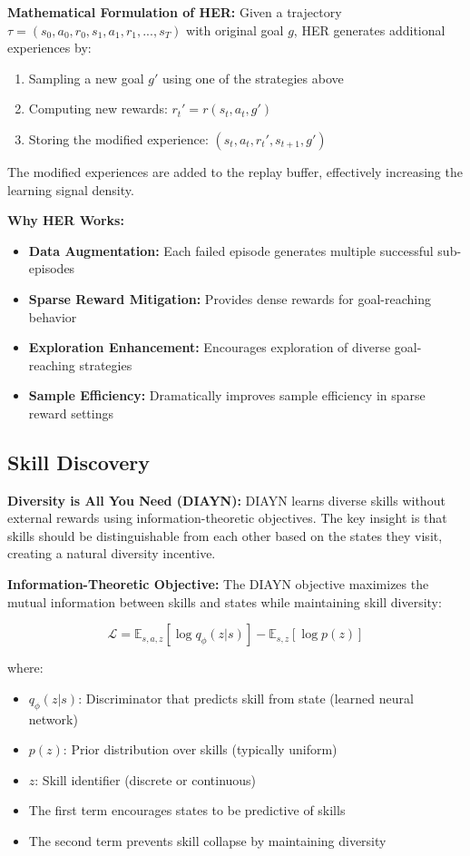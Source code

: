 \documentclass[12pt]{article}
\begin{document}
{{\textbf{Mathematical Formulation of HER:}
Given a trajectory $\tau = (s_0, a_0, r_0, s_1, a_1, r_1, ..., s_T)$ with original goal $g$, HER generates additional experiences by:

\begin{enumerate}
    \item Sampling a new goal $g'$ using one of the strategies above
    \item Computing new rewards: $r_t' = r(s_t, a_t, g')$
    \item Storing the modified experience: $(s_t, a_t, r_t', s_{t+1}, g')$
\end{enumerate}

The modified experiences are added to the replay buffer, effectively increasing the learning signal density.

\textbf{Why HER Works:}
\begin{itemize}
    \item \textbf{Data Augmentation:} Each failed episode generates multiple successful sub-episodes
    \item \textbf{Sparse Reward Mitigation:} Provides dense rewards for goal-reaching behavior
    \item \textbf{Exploration Enhancement:} Encourages exploration of diverse goal-reaching strategies
    \item \textbf{Sample Efficiency:} Dramatically improves sample efficiency in sparse reward settings
\end{itemize}

\subsection{Skill Discovery}

\textbf{Diversity is All You Need (DIAYN):}
DIAYN learns diverse skills without external rewards using information-theoretic objectives. The key insight is that skills should be distinguishable from each other based on the states they visit, creating a natural diversity incentive.

\textbf{Information-Theoretic Objective:}
The DIAYN objective maximizes the mutual information between skills and states while maintaining skill diversity:

\[
\mathcal{L} = \mathbb{E}_{s,a,z}[\log q_\phi(z|s)] - \mathbb{E}_{s,z}[\log p(z)]
\]

where:
\begin{itemize}
    \item $q_\phi(z|s)$: Discriminator that predicts skill from state (learned neural network)
    \item $p(z)$: Prior distribution over skills (typically uniform)
    \item $z$: Skill identifier (discrete or continuous)
    \item The first term encourages states to be predictive of skills
    \item The second term prevents skill collapse by maintaining diversity
\end{itemize}

}}
\end{document}
